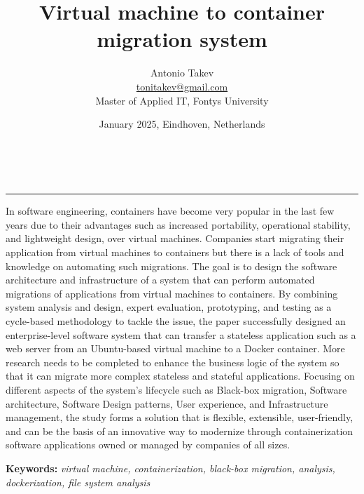 \documentclass{article}
\title{
    Virtual machine to container migration system
}
\author{
    Antonio Takev \\
    \href{mailto:tonitakev@gmail.com}{tonitakev@gmail.com} \\
    Master of Applied IT, Fontys University
}
\date{January 2025, Eindhoven, Netherlands}
\makeatletter
\renewenvironment{abstract}
 {\par\noindent{\Large\textbf{\abstractname}}\par \vspace{1em}}
 {\par\noindent\medskip}
\renewcommand{\maketitle}{
  \begin{center}
    \LARGE \textbf{\@title}
  \end{center}
  \vspace{0.4cm}
  \begin{flushleft}
    \@author \\[0.5em]  %
    \@date
  \end{flushleft}
}
\makeatother
\begin{document}
\maketitle

{\color{gray}\hrule}
\vspace{0.4cm}
\begin{abstract}
In software engineering, containers have become very popular in the last few years due to their advantages such as increased portability, operational stability, and lightweight design, over virtual machines. Companies start migrating their application from virtual machines to containers but there is a lack of tools and knowledge on automating such migrations. The goal is to design the software architecture and infrastructure of a system that can perform automated migrations of applications from virtual machines to containers. By combining system analysis and design, expert evaluation, prototyping, and testing as a cycle-based methodology to tackle the issue, the paper successfully designed an enterprise-level software system that can transfer a stateless application such as a web server from an Ubuntu-based virtual machine to a Docker container. More research needs to be completed to enhance the business logic of the system so that it can migrate more complex stateless and stateful applications. Focusing on different aspects of the system's lifecycle such as Black-box migration, Software architecture, Software Design patterns, User experience, and Infrastructure management, the study forms a solution that is flexible, extensible, user-friendly, and can be the basis of an innovative way to modernize through containerization software applications owned or managed by companies of all sizes.
\end{abstract}

\vspace{1em} %
\noindent\textbf{Keywords:} \textit{virtual machine, containerization, black-box migration, analysis, dockerization, file system analysis} \\
\noindent{\color{gray}\hrule}
\end{document}
